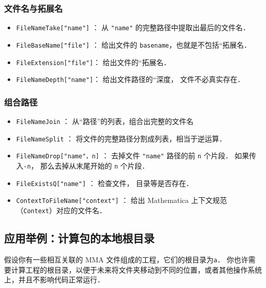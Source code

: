 \subsubsection{文件名与拓展名}

\begin{itemize}
\item \verb`FileNameTake["name"]` ： 从 \verb`"name"` 的完整路径中提取出最后的文件名．
\item \verb`FileBaseName["file"]` ： 给出文件的 \verb`basename`，也就是不包括“拓展名．
\item \verb`FileExtension["file"]`： 给出文件的“拓展名．
\item \verb`FileNameDepth["name"]`： 给出文件路径的“深度， 文件不必真实存在．
\end{itemize}

\subsubsection{组合路径}

\begin{itemize}
\item \verb`FileNameJoin` ： 从“路径”的列表，组合出完整的文件名
\item \verb`FileNameSplit` ： 将文件的完整路径分割成列表，相当于逆运算．
\item \verb`FileNameDrop["name"，n]` ： 去掉文件 \verb`"name"` 路径的前 \verb`n` 个片段． 
如果传入\verb`-n`， 那么去掉从末尾开始的 \verb`n` 个片段．
\item \verb`FileExistsQ["name"]`  ： 检查文件， 目录等是否存在．
\item \verb`ContextToFileName["context"]`  ： 给出 Mathematica 上下文规范（\verb`Context`）对应的文件名．
\end{itemize}

\subsection{应用举例：计算包的本地根目录}

假设你有一些相互关联的 MMA 文件组成的工程，它们的根目录为\verb`a`．
你也许需要计算工程的根目录，以便于未来将文件夹移动到不同的位置，或者其他操作系统上，并且不影响代码正常运行．


